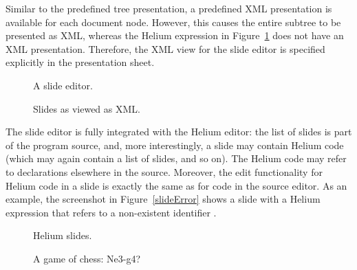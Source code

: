 \bc Similar to the predefined tree presentation, a predefined XML presentation is available for each document node. However, this causes the entire subtree to be presented as XML, whereas the Helium expression in Figure~\ref{slideEditorSource} does not have an XML presentation. Therefore, the XML view for the slide editor is  specified explicitly in the presentation sheet. \ec

\begin{figure}
  \begin{minipage}[t]{.40\textwidth}
    \begin{center}   
      \caption{A slide editor.} \label{slideEditorWYSIWYG}
    \end{center}
  \end{minipage}
\hfill
  \begin{minipage}[t]{.57\textwidth}
    \begin{center}  
      \caption{Slides as viewed as XML.} \label{slideEditorSource}
    \end{center}
  \end{minipage}
\end{figure}


The slide editor is fully integrated with the Helium editor: the list of slides is part of the program source, and, more interestingly, a slide may contain Helium code (which may again contain a list of slides, and so on). The Helium code may refer to declarations elsewhere in the source. Moreover, the edit functionality for Helium code in a slide is exactly the same as for code in the source editor. As an example, the screenshot in Figure~\ref{slideError} shows a slide with  a Helium expression that refers to a non-existent identifier .

\begin{figure}
\begin{minipage}[t]{.47\textwidth}
    \begin{center}   
      \caption{Helium slides.} \label{slideError}
    \end{center}
  \end{minipage}
\hfill
\begin{minipage}[t]{.47\textwidth}
    \begin{center}  
      \caption{A game of chess: Ne3-g4?}\label{chessBoard} 
    \end{center}
  \end{minipage}
\end{figure}



